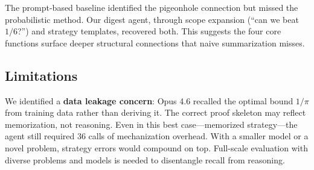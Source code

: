 The prompt-based baseline identified the pigeonhole connection but missed the probabilistic method. Our digest agent, through scope expansion (``can we beat $1/6$?'') and strategy templates, recovered both. This suggests the four core functions surface deeper structural connections that naive summarization misses.

\subsection{Limitations}

We identified a \textbf{data leakage concern}: Opus 4.6 recalled the optimal bound $1/\pi$ from training data rather than deriving it. The correct proof skeleton may reflect memorization, not reasoning. Even in this best case---memorized strategy---the agent still required 36 calls of mechanization overhead. With a smaller model or a novel problem, strategy errors would compound on top. Full-scale evaluation with diverse problems and models is needed to disentangle recall from reasoning.
